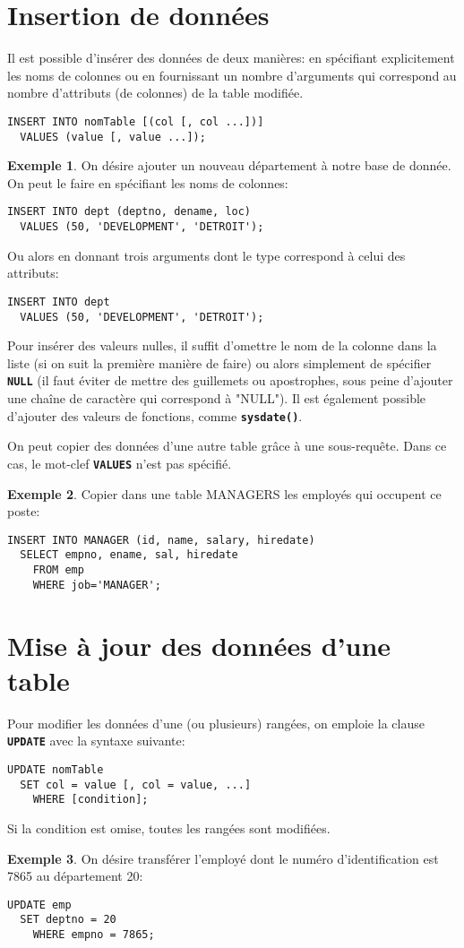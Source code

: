 \documentclass[a4paper, 12pt]{report}
\newcommand{\textSQL}[1]{\texttt{\textbf{#1}}}
\theoremstyle{definition} \newtheorem{ex}{Exemple}
\begin{document}
\section{Insertion de données}
Il est possible d'insérer des données de deux manières: en spécifiant explicitement les noms de colonnes ou en fournissant un nombre d'arguments qui correspond au nombre d'attributs (de colonnes) de la table modifiée.
\begin{lstlisting}[frame=single]
INSERT INTO nomTable [(col [, col ...])]
  VALUES (value [, value ...]);
\end{lstlisting}
\begin{ex}
On désire ajouter un nouveau département à notre base de donnée. On peut le faire en spécifiant les noms de colonnes:
\begin{lstlisting}[frame=single]
INSERT INTO dept (deptno, dename, loc)
  VALUES (50, 'DEVELOPMENT', 'DETROIT');
\end{lstlisting}
Ou alors en donnant trois arguments dont le type correspond à celui des attributs:
\begin{lstlisting}[frame=single]
INSERT INTO dept
  VALUES (50, 'DEVELOPMENT', 'DETROIT');
\end{lstlisting}
\end{ex}
Pour insérer des valeurs nulles, il suffit d'omettre le nom de la colonne dans la liste (si on suit la première manière de faire) ou alors simplement de spécifier \textSQL{NULL} (il faut éviter de mettre des guillemets ou apostrophes, sous peine d'ajouter une chaîne de caractère qui correspond à "NULL"). Il est également possible d'ajouter des valeurs de fonctions, comme \textSQL{sysdate()}.

On peut copier des données d'une autre table grâce à une sous-requête. Dans ce cas, le mot-clef \textSQL{VALUES} n'est pas spécifié.
\begin{ex}
	Copier dans une table MANAGERS les employés qui occupent ce poste:
\begin{lstlisting}[frame=single]
INSERT INTO MANAGER (id, name, salary, hiredate)
  SELECT empno, ename, sal, hiredate
	FROM emp
	WHERE job='MANAGER';
\end{lstlisting}
\end{ex}

\section{Mise à jour des données d'une table}
Pour modifier les données d'une (ou plusieurs) rangées, on emploie la clause \textSQL{UPDATE} avec la syntaxe suivante:
\begin{lstlisting}[frame=single]
UPDATE nomTable
  SET col = value [, col = value, ...]
	WHERE [condition];
\end{lstlisting}
Si la condition est omise, toutes les rangées sont modifiées.
\begin{ex}
On désire transférer l'employé dont le numéro d'identification est 7865 au département 20:
\begin{lstlisting}[frame=single]
UPDATE emp
  SET deptno = 20
	WHERE empno = 7865;
\end{lstlisting}
\end{ex}
\end{document}
